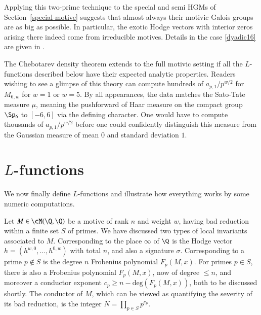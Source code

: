 \documentclass{notices}
\numberwithin{equation}{section}
\numberwithin{table}{section}
\numberwithin{figure}{section}
\begin{document}
{Applying this two-prime technique to the special and semi HGMs 
of Section~\ref{special-motive} suggests that almost always their motivic Galois
groups are as big as possible.  In particular, the exotic Hodge vectors with
interior zeros arising there indeed come from irreducible motives.  
Details in the case \eqref{dyadic16} are given in \cite{Rob}.  

The Chebotarev density theorem extends to the full motivic
setting if all the $L$-functions described below 
have their expected analytic properties.  
Readers wishing to see a glimpse of this theory 
can compute hundreds of $a_{p,1}/p^{w/2}$ 
for $M_{6,w}$ for $w=1$ or $w=5$.  
 By all appearances, the data matches the Sato-Tate
measure $\mu$, meaning the pushforward
of Haar measure on the compact group $\Sp_6$ to $[-6,6]$ via 
the defining character.    One would have to 
compute thousands of $a_{p,1}/p^{w/2}$ before one 
could confidently distinguish this measure
from the Gaussian measure
of mean $0$ and standard deviation $1$.  

\section{$L$-functions}
\label{sect:L-functions}

We now finally define $L$-functions and illustrate
how everything works by some numeric computations.  

  Let $M \in \cM(\Q,\Q)$ be a motive of rank $n$ and weight $w$, having bad
reduction within a finite set $S$ of primes.  We have
discussed two types of local invariants associated to $M$. 
Corresponding to the place $\infty$ of $\Q$ is the
Hodge vector $h = (h^{w,0},\dots,h^{0,w})$ with
total $n$, and also a signature $\sigma$. 
Corresponding to a prime $p \not \in S$ is 
the degree $n$ Frobenius polynomial 
$F_p(M,x)$.   For primes $p \in S$, there
is also a Frobenius polynomial $F_p(M,x)$, now 
of degree $\leq n$, and moreover a conductor exponent $c_p \geq n-\mbox{deg}(F_p(M,x))$,
both to be discussed shortly.  The 
conductor of $M$, which can be 
viewed as quantifying the severity
of its bad reduction, is the integer $N = \prod_{p \in S} p^{c_p}$.  

}
\end{document}
